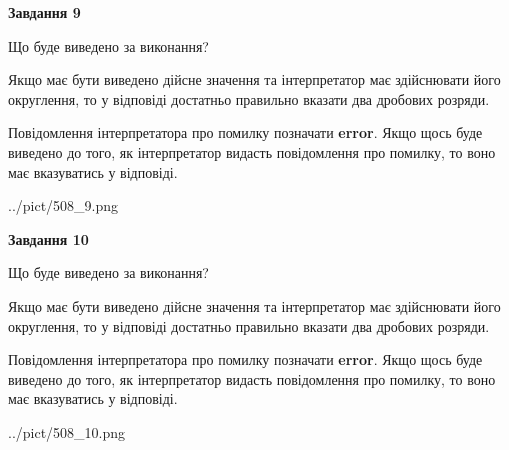 \documentclass[12pt, ukrainian]{article}
\begin{document}
{\begin {Large}
{\begin {center}\textbf{Завдання 9}\end {center}}\par
Що буде виведено за виконання? \par

Якщо має бути виведено дійсне значення та інтерпретатор має здійснювати його округлення, 
то у відповіді достатньо правильно вказати два дробових розряди.

Повідомлення інтерпретатора про помилку позначати \textbf{error}.
Якщо щось буде виведено до того, як інтерпретатор видасть повідомлення про помилку, 
то воно має вказуватись у відповіді. \par

\begin{center}
	{../pict/508_9.png}
\end{center}
\newpage

{\begin {center}\textbf{Завдання 10}\end {center}}\par
Що буде виведено за виконання? \par

Якщо має бути виведено дійсне значення та інтерпретатор має здійснювати його округлення, 
то у відповіді достатньо правильно вказати два дробових розряди.

Повідомлення інтерпретатора про помилку позначати \textbf{error}.
Якщо щось буде виведено до того, як інтерпретатор видасть повідомлення про помилку, 
то воно має вказуватись у відповіді. \par

\begin{center}
	{../pict/508_10.png}
\end{center}
\newpage

\end {Large}}
\end{document}
